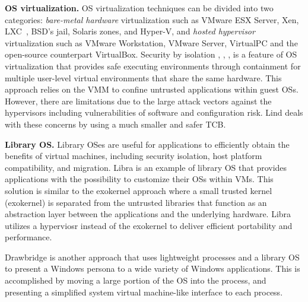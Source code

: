 \textbf{OS virtualization.}
OS virtualization techniques can be divided into two categories:
\textit{bare-metal hardware} virtualization such as VMware ESX Server, Xen,
LXC~\cite{LXC}, BSD’s jail, Solaris zones, and Hyper-V, and 
\textit{hosted hypervisor} virtualization such as VMware
Workstation, VMware Server, VirtualPC and the open-source counterpart
VirtualBox.
%
Security by isolation \cite{Qubes}, \cite{Overshadow},
\cite{SecureVM}, \cite{HypSec} is a feature of OS virtualization that
provides safe executing environments through containment for multiple
user-level virtual environments that share the same hardware. This
approach relies on the VMM to confine untrusted applications within
guest OSs. However, there are limitations due to
the large attack vectors against the hypervisors including
vulnerabilities of software and configuration risk. 
Lind deals with these concerns by using a much smaller and safer TCB.

\textbf{Library OS.}
Library OSes are useful for applications to efficiently
obtain the benefits of virtual machines,
including security isolation, host platform compatibility, and
migration. Libra \cite {Libra} is an example of library OS that provides applications with the possibility to customize their OSs within VMs. This solution is similar to the exokernel approach where a small trusted kernel (exokernel) is separated from the untrusted libraries that function as an abstraction layer between the applications and the underlying hardware. Libra utilizes a hyperviosr instead of the exokernel to deliver efficient portability and performance.

Drawbridge \cite{Drawbridge-11} 
is another approach that uses lightweight processes and a library OS to present a Windows
persona to a wide variety of Windows applications.
This is accomplished by moving a large portion of the OS into the
process, and presenting a simplified system
virtual machine-like interface to each process. 

